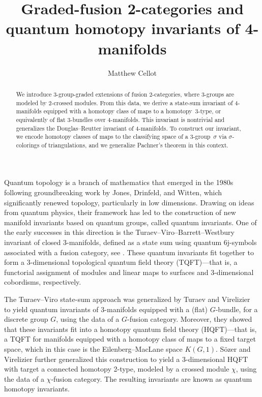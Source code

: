 \documentclass[a4paper, oneside]{amsart}
\title{Graded-fusion 2-categories and quantum homotopy invariants of 4-manifolds}
\author{Matthew Cellot}
\makeatletter
\let\origsection\section
\renewcommand\section{\@ifstar{\starsection}{\nostarsection}}
\newcommand\nostarsection[1]
{\sectionprelude\origsection{#1}\sectionpostlude}
\newcommand\starsection[1]
{\sectionprelude\origsection*{#1}\sectionpostlude}
\newcommand\sectionprelude{%
  \vspace{1em}
}
\newcommand\sectionpostlude{%
  \vspace{1em}
}
\numberwithin{equation}{subsection}
\theoremstyle{referencedlemma}
\theoremstyle{plain} %
\theoremstyle{remark}
\makeatother
\begin{document}
\begin{abstract}
We introduce 3-group-graded extensions of fusion 2-categories, where 3-groups are modeled by \mbox{2-crossed} modules.  From this data, we derive a state-sum invariant of 4-manifolds equipped with a homotopy class of maps to a homotopy~3-type, or equivalently of flat 3-bundles over 4-manifolds.  This invariant is nontrivial and generalizes the Douglas--Reutter invariant of 4-manifolds.  To construct our invariant, we encode homotopy classes of maps to the classifying space of a 3-group~$\sigma$ via $\sigma$-colorings of triangulations, and we generalize Pachner's theorem in this context. 
\end{abstract}

\maketitle

\section{Introduction}

\noindent Quantum topology is a branch of mathematics that emerged in the 1980s following groundbreaking work by Jones, Drinfeld, and Witten, which significantly renewed topology, particularly in low dimensions.  Drawing on ideas from quantum physics, their framework has led to the construction of new manifold invariants based on quantum groups, called quantum invariants.   One of the early successes in this direction is the Turaev--Viro--Barrett--Westbury invariant of closed 3-manifolds,  defined as a state sum using quantum 6j-symbols associated with a fusion category, see \cite{turaev_state_1992, barrett_invariants_1996}.  These quantum invariants fit together to form a 3-dimensional topological quantum field theory (TQFT)---that is, a functorial assignment of modules and linear maps to surfaces and 3-dimensional cobordisms, respectively.  

The Turaev--Viro state-sum approach was generalized by Turaev and Virelizier~\cite{turaev_3-dimensional_2012} to yield quantum invariants of 3-manifolds equipped with a (flat) $G$-bundle, for a discrete group $G$, using the data of a $G$-fusion category. Moreover, they showed that these invariants fit into a  homotopy quantum field theory (HQFT)---that is, a TQFT for manifolds equipped with a homotopy class of maps to a fixed target space, which in this case is the Eilenberg--MacLane space $K(G,1)$.  Sözer and Virelizier further generalized this construction to yield a 3-dimensional HQFT with target a connected homotopy 2-type, modeled by a crossed module $\chi$, using the data of a $\chi$-fusion category.  The resulting invariants are known as quantum homotopy invariants.
\end{document}
